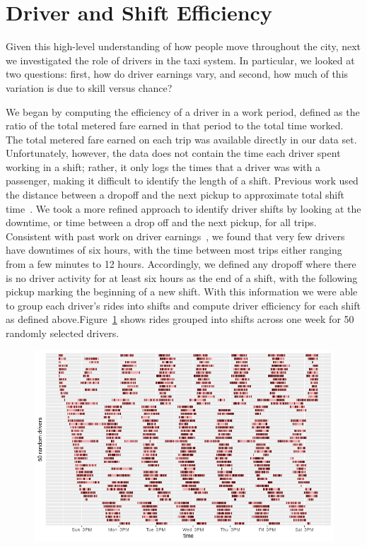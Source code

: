 \documentclass[twocolumn]{article}
\begin{document}
\section{Driver and Shift Efficiency}
Given this high-level understanding of how people move throughout the city, next we investigated the role of drivers in the taxi system. In particular, we looked at two questions: first, how do driver earnings vary, and second, how much of this variation is due to skill versus chance?

We began by computing the efficiency of a driver in a work period, defined as the ratio of the total metered fare earned in that period to the total time worked. The total metered fare earned on each trip was available directly in our data set. Unfortunately, however, the data does not contain the time each driver spent working in a shift; rather, it only logs the times that a driver was with a passenger, making it difficult to identify the length of a shift. Previous work used the distance between a dropoff and the next pickup to approximate total shift time~\cite{LEE:2015}. We took a more refined approach to identify driver shifts by looking at the downtime, or time between a drop off and the next pickup, for all trips.
Consistent with past work on driver earnings~\cite{Farber:2014}, we found that very few drivers have downtimes of six hours, with the time between most trips either ranging from a few minutes to 12 hours. %
Accordingly, we defined any dropoff where there is no driver activity for at least six hours as the end of a shift, with the following pickup marking the beginning of a new shift.
With this information we were able to group each driver's rides into shifts and compute driver efficiency for each shift as defined above.Figure~\ref{fig:shifts_id} shows rides grouped into shifts across one week for 50 randomly selected drivers.
\begin{figure}[t]
  \centering
  \includegraphics[width=1\linewidth]{shifts_id}
  \label{fig:shifts_id}
\end{figure}
\end{document}
